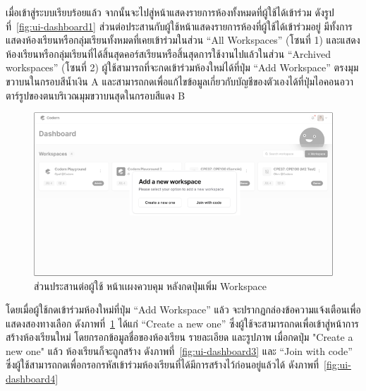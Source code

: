 \documentclass[12pt,oneside,openright,a4paper]{cpe-thai-project}
\begin{document}
    \begin{flushleft}
    เมื่อเข้าสู่ระบบเรียบร้อยแล้ว จากนั้นจะไปสู่หน้าแสดงรายการห้องทั้งหมดที่ผู้ใช้ได้เข้าร่วม ดังรูปที่~\ref{fig:ui-dashboard1} ส่วนต่อประสานกับผู้ใช้หน้าแสดงรายการห้องที่ผู้ใช้ได้เข้าร่วมอยู่ มีทั้งการแสดงห้องเรียนหรือกลุ่มเรียนทั้งหมดที่เคยเข้าร่วมในส่วน “All Workspaces” (โซนที่ 1) และแสดงห้องเรียนหรือกลุ่มเรียนที่ได้สิ้นสุดคอร์สเรียนหรือสิ้นสุดการใช้งานไปแล้วในส่วน “Archived workspaces” (โซนที่ 2) ผู้ใช้สามารถที่จะกดเข้าร่วมห้องใหม่ได้ที่ปุ่ม “Add Workspace” ตรงมุมขวาบนในกรอบสีน้ำเงิน A และสามารถกดเพื่อแก้ไขข้อมูลเกี่ยวกับบัญชีของตัวเองได้ที่ปุ่มไอคอนอวาตาร์รูปของตนบริเวณมุมขวาบนสุดในกรอบสีแดง B
    \end{flushleft}
    
    \hypertarget{ui-dashboard2}{
        \begin{figure}[H]
        \centering
            \includegraphics[width=15cm]{figure/ui/ui-dashboard2.png}
            \caption[ส่วนประสานต่อผู้ใช้ หน้าเเผงควบคุม (2)]{ส่วนประสานต่อผู้ใช้ หน้าเเผงควบคุม หลังกดปุ่มเพิ่ม Workspace}\label{fig:ui-dashboard2}
        \end{figure}
    }
    \begin{flushleft}
    โดยเมื่อผู้ใช้กดเข้าร่วมห้องใหม่ที่ปุ่ม “Add Workspace” แล้ว จะปรากฏกล่องข้อความแจ้งเตือนเพื่อแสดงสองทางเลือก ดังภาพที่~\ref{fig:ui-dashboard2} ได้แก่ “Create a new one” ซึ่งผู้ใช้จะสามารถกดเพื่อเข้าสู่หน้าการสร้างห้องเรียนใหม่ โดยกรอกข้อมูลชื่อของห้องเรียน รายละเอียด และรูปภาพ เมื่อกดปุ่ม "Create a new one" แล้ว ห้องเรียนก็จะถูกสร้าง ดังภาพที่~\ref{fig:ui-dashboard3} และ “Join with code” ซึ่งผู้ใช้สามารถกดเพื่อกรอกรหัสเข้าร่วมห้องเรียนที่ได้มีการสร้างไว้ก่อนอยู่แล้วได้ ดังภาพที่~\ref{fig:ui-dashboard4}
    \end{flushleft}
\end{document}
